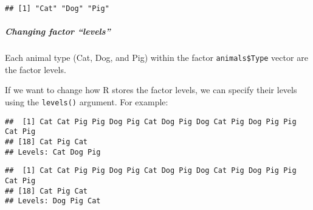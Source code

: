 \documentclass[]{article}
\newenvironment{Shaded}{\begin{snugshade}}{\end{snugshade}}
\newcommand{\KeywordTok}[1]{\textcolor[rgb]{0.13,0.29,0.53}{\textbf{#1}}}
\newcommand{\DataTypeTok}[1]{\textcolor[rgb]{0.13,0.29,0.53}{#1}}
\newcommand{\StringTok}[1]{\textcolor[rgb]{0.31,0.60,0.02}{#1}}
\newcommand{\CommentTok}[1]{\textcolor[rgb]{0.56,0.35,0.01}{\textit{#1}}}
\newcommand{\OperatorTok}[1]{\textcolor[rgb]{0.81,0.36,0.00}{\textbf{#1}}}
\newcommand{\NormalTok}[1]{#1}
\let\oldsubparagraph\subparagraph
\renewcommand{\subparagraph}[1]{\oldsubparagraph{#1}\mbox{}}
\begin{document}
\begin{Shaded}
\end{Shaded}

\begin{verbatim}
## [1] "Cat" "Dog" "Pig"
\end{verbatim}

\subparagraph{\texorpdfstring{Changing factor
``levels''}{Changing factor levels}}\label{changing-factor-levels}

Each animal type (Cat, Dog, and Pig) within the factor
\texttt{animals\$Type} vector are the factor levels.

If we want to change how R stores the factor levels, we can specify
their levels using the \texttt{levels()} argument. For example:

\begin{Shaded}
\end{Shaded}

\begin{verbatim}
##  [1] Cat Cat Pig Pig Dog Pig Cat Dog Pig Dog Cat Pig Dog Pig Pig Cat Pig
## [18] Cat Pig Cat
## Levels: Cat Dog Pig
\end{verbatim}

\begin{Shaded}
\end{Shaded}

\begin{verbatim}
##  [1] Cat Cat Pig Pig Dog Pig Cat Dog Pig Dog Cat Pig Dog Pig Pig Cat Pig
## [18] Cat Pig Cat
## Levels: Dog Pig Cat
\end{verbatim}
\end{document}
